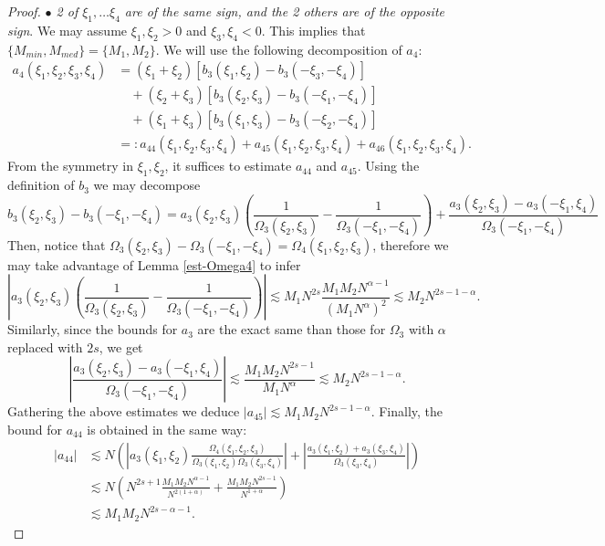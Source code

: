 \documentclass{amsart}
\theoremstyle{definition}
\theoremstyle{remark}
\numberwithin{equation}{section}
\begin{document}
\begin{proof}
  \noindent
  \textit{$\bullet$ 2 of $\xi_1,\ldots \xi_4$ are of the same sign, and the 2 others are of the opposite sign}. We may assume $\xi_1,\xi_2>0$ and $\xi_3,\xi_4<0$. This implies that $\{M_{min},M_{med}\} = \{M_1,M_2\}$. We will use the following decomposition of $a_4$:
  \begin{align}
   a_4(\xi_1,\xi_2,\xi_3,\xi_4) &= (\xi_1+\xi_2)[b_3(\xi_1,\xi_2) - b_3(-\xi_3,-\xi_4)]\nonumber \\
   &\quad + (\xi_2+\xi_3)[b_3(\xi_2,\xi_3) - b_3(-\xi_1,-\xi_4)] \nonumber\\
   &\quad + (\xi_1+\xi_3)[b_3(\xi_1,\xi_3) - b_3(-\xi_2,-\xi_4)] \nonumber\\   
   & =: a_{44}(\xi_1,\xi_2,\xi_3,\xi_4) +a_{45}(\xi_1,\xi_2,\xi_3,\xi_4) +a_{46}(\xi_1,\xi_2,\xi_3,\xi_4).\label{a4}
  \end{align}
  From the symmetry in $\xi_1,\xi_2$, it suffices to estimate $a_{44}$ and $a_{45}$. Using the definition of $b_3$ we may decompose
  $$
  b_3(\xi_2, \xi_3) - b_3(-\xi_1, -\xi_4) = a_3(\xi_2,\xi_3)\left(\frac{1}{\Omega_3(\xi_2,\xi_3)} - \frac{1}{\Omega_3(-\xi_1,-\xi_4)}\right) + \frac{a_3(\xi_2,\xi_3)-a_3(-\xi_1,\xi_4)}{\Omega_3(-\xi_1,-\xi_4)}
  $$
  Then, notice that $\Omega_3(\xi_2,\xi_3)-\Omega_3(-\xi_1,-\xi_4) = \Omega_4(\xi_1,\xi_2,\xi_3)$, therefore we may take advantage of Lemma \ref{est-Omega4} to infer
  $$
  \left| a_3(\xi_2,\xi_3)\left(\frac{1}{\Omega_3(\xi_2,\xi_3)} - \frac{1}{\Omega_3(-\xi_1,-\xi_4)}\right) \right| \lesssim M_1N^{2s}\frac{M_1M_2N^{\alpha-1}}{(M_1N^\alpha)^2} \lesssim M_2N^{2s-1-\alpha}.
  $$ 
  Similarly, since the bounds for $a_3$ are the exact same than those for $\Omega_3$ with $\alpha$ replaced with $2s$, we get
  $$
  \left| \frac{a_3(\xi_2,\xi_3)-a_3(-\xi_1,\xi_4)}{\Omega_3(-\xi_1,-\xi_4)} \right| \lesssim \frac{M_1M_2N^{2s-1}}{M_1N^\alpha} \lesssim M_2N^{2s-1-\alpha}.
  $$
  Gathering the above estimates we deduce $|a_{45}|\lesssim M_1M_2N^{2s-1-\alpha}$.
 Finally, the bound for $a_{44}$ is obtained in the same way:
 \begin{align*}
   |a_{44}| &\lesssim N \left( \left|a_3(\xi_1,\xi_2)\frac{\Omega_4(\xi_1,\xi_2,\xi_3)}{\Omega_3(\xi_1,\xi_2)\Omega_3(\xi_3,\xi_4)}\right| + \left|\frac{a_3(\xi_1,\xi_2)+a_3(\xi_3,\xi_4)}{\Omega_3(\xi_3,\xi_4)}\right|  \right)\\
   &\lesssim N\left( N^{2s+1}\frac{M_1M_2N^{\alpha-1}}{N^{2(1+\alpha)}} + \frac{M_1M_2N^{2s-1}}{N^{1+\alpha}} \right)\\
   &\lesssim M_1M_2N^{2s-\alpha-1}.
 \end{align*} 
\end{proof}
\end{document}
